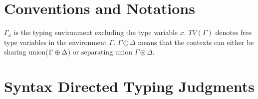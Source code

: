 
\section{Conventions and Notations}
$\Gamma_{x}$ is the typing environment excluding the type variable $x$. $TV(\Gamma)$ denotes free type
variables in the environment $\Gamma$. $\Gamma \odot \Delta$ means that the contexts can either
be sharing union($\Gamma \varoplus \Delta$) or separating union $\Gamma \circledast \Delta$.

\section{Syntax Directed Typing Judgments}


